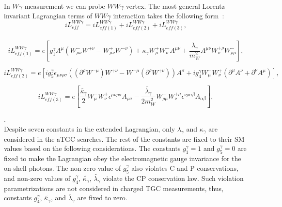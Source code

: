 In $W\gamma$ measurement we can probe $WW\gamma$ vertex. The most general Lorentz invariant Lagrangian terms of $WW\gamma$ interaction takes the following form~\cite{ref_theory_aTGC}:\\

\begin{equation}\label{L_ATGC}
i L_{eff}^{WW\gamma}= i L_{eff(1)}^{WW\gamma} + i L_{eff(2)}^{WW\gamma} + i L_{eff(3)}^{WW\gamma},
\end{equation}
\\

\begin{equation}\label{L_ATGC_1}
i L_{eff(1)}^{WW\gamma}= e [ g_1^{\gamma} A^\mu (W_{\mu\nu}^- W^{+\nu} - W_{\mu\nu}^+ W^{-\nu}) + \kappa_\gamma W_{\mu}^+ W_{\nu}^- A^{\mu\nu} + {\frac{\lambda_\gamma}{m^2_W}} A^{\mu\nu} W_\nu^{+\rho} W_{\rho\mu}^- ],
\end{equation}

\begin{equation}\label{L_ATGC_2}
i L_{eff(2)}^{WW\gamma}= e [ i g_5^\gamma \epsilon_{\mu\nu\rho\sigma}((\partial^\rho W^{-\mu})W^{+\nu} - W^{-\mu}(\partial^{\rho}W^{+\nu}))A^\sigma + i g_4^\gamma W_\mu^- W_\nu^+ (\partial^\mu A^\nu + \partial^\nu A^\mu) ],
\end{equation}

\begin{equation}\label{L_ATGC_3}
i L_{eff(3)}^{WW\gamma}= e [ \frac{\tilde{\kappa_\gamma}}{2} W_\mu^- W_\nu^+ \epsilon^{\mu\nu\rho\sigma} A_{\rho\sigma} - \frac{\tilde{\lambda_\gamma}}{2 m_W^2} W_{\rho\mu}^- W^{+\mu}_{\nu} \epsilon^{\nu\rho\alpha\beta} A_{\alpha\beta}],
\end{equation}

.\\

Despite seven constants in the extended Lagrangian, only $\lambda_\gamma$ and $\kappa_\gamma$ are considered in the aTGC searches. The rest of the constants are fixed to their SM values based on the following considerations. The constants $g_1^\gamma=1$ and $g_5^\gamma=0$ are fixed to make the Lagrangian obey the electromagnetic gauge invariance for the on-shell photons. The non-zero value of $g_5^\gamma$ also violates C and P conservations, and non-zero values of $g_4^\gamma$, $\tilde{\kappa_\gamma}$, $\tilde{\lambda_\gamma}$ violate the CP conservation law. Such violation parametrizations are not considered in charged TGC measurements, thus, constants $g_4^\gamma$, $\tilde{\kappa_\gamma}$, and $\tilde{\lambda_\gamma}$ are fixed to zero.\\

